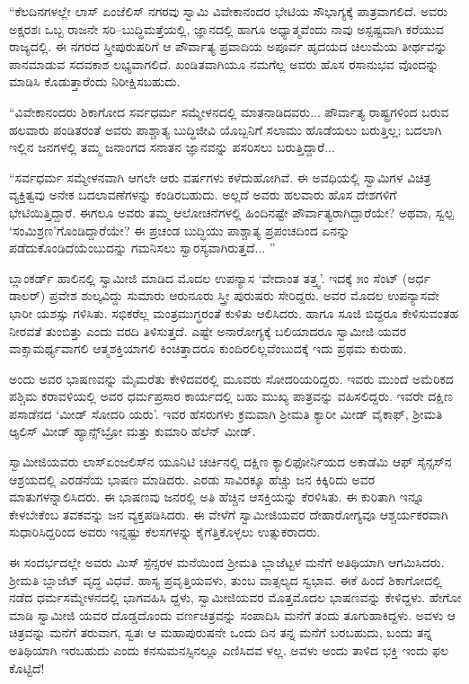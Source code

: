 “ಕೆಲದಿನಗಳಲ್ಲೇ ಲಾಸ್ ಏಂಜೆಲಿಸ್ ನಗರವು ಸ್ವಾಮಿ ವಿವೇಕಾನಂದರ ಭೇಟಿಯ ಸೌಭಾಗ್ಯಕ್ಕೆ ಪಾತ್ರವಾಗಲಿದೆ. ಅವರು ಅಕ್ಷರಶಃ ಒಬ್ಬ ರಾಜನೇ ಸರಿ–ಬುದ್ಧಿಮತ್ತೆಯಲ್ಲಿ, ಜ್ಞಾನದಲ್ಲಿ ಹಾಗೂ ಅಧ್ಯಾತ್ಮವೆಂದು ನಾವು ಅಸ್ಪಷ್ಟವಾಗಿ ಕರೆಯುವ ರಾಜ್ಯದಲ್ಲಿ. ಈ ನಗರದ ಸ್ತ್ರೀಪುರುಷರಿಗೆ ಆ ಪೌರ್ವಾತ್ಯ ಪ್ರವಾದಿಯ ಅಪೂರ್ವ ಹೃದಯದ ಚಿಲುಮೆಯ ತೀರ್ಥವನ್ನು ಪಾನಮಾಡುವ ಸದವಕಾಶ ಲಭ್ಯವಾಗಲಿದೆ. ಖಂಡಿತವಾಗಿಯೂ ನಮಗೆಲ್ಲ ಅವರು ಹೊಸ ರಸಾನುಭವ ವೊಂದನ್ನು ಮಾಡಿಸಿ ಕೊಡುತ್ತಾರೆಂದು ನಿರೀಕ್ಷಿಸಬಹುದು.

“ವಿವೇಕಾನಂದರು ಶಿಕಾಗೋದ ಸರ್ವಧರ್ಮ ಸಮ್ಮೇಳನದಲ್ಲಿ ಮಾತನಾಡಿದವರು... ಪೌರ್ವಾತ್ಯ ರಾಷ್ಟ್ರಗಳಿಂದ ಬರುವ ಹಲವಾರು ಪಂಡಿತರಂತೆ ಅವರು ಪಾಶ್ಚಾತ್ಯ ಬುದ್ಧಿಜೀವಿ ಯೊಬ್ಬನಿಗೆ ಸಲಾಮು ಹೊಡೆಯಲು ಬರುತ್ತಿಲ್ಲ; ಬದಲಾಗಿ ಇಲ್ಲಿನ ಜನಗಳಲ್ಲಿ ತಮ್ಮ ಜನಾಂಗದ ಸನಾತನ ಜ್ಞಾನವನ್ನು ಪಸರಿಸಲು ಬರುತ್ತಿದ್ದಾರೆ...

“ಸರ್ವಧರ್ಮ ಸಮ್ಮೇಳನವಾಗಿ ಆಗಲೇ ಆರು ವರ್ಷಗಳು ಕಳೆದುಹೋಗಿವೆ. ಈ ಅವಧಿಯಲ್ಲಿ ಸ್ವಾಮಿಗಳ ವಿಚಿತ್ರ ವ್ಯಕ್ತಿತ್ವವು ಅನೇಕ ಬದಲಾವಣೆಗಳನ್ನು ಕಂಡಿರಬಹುದು. ಅಲ್ಲದೆ ಅವರು ಹಲವಾರು ಹೊಸ ದೇಶಗಳಿಗೆ ಭೇಟಿಯಿತ್ತಿದ್ದಾರೆ. ಈಗಲೂ ಅವರು ತಮ್ಮ ಆಲೋಚನೆಗಳಲ್ಲಿ ಹಿಂದಿನಷ್ಟೇ ಪೌರ್ವಾತ್ಯರಾಗಿದ್ದಾರೆಯೇ? ಅಥವಾ, ಸ್ವಲ್ಪ ‘ಸಂಮಿಶ್ರಣ’ಗೊಂಡಿದ್ದಾರೆಯೇ? ಈ ಪ್ರಚಂಡ ಬುದ್ಧಿಯು ಪಾಶ್ಚಾತ್ಯ ಪ್ರಪಂಚದಿಂದ ಏನನ್ನು ಪಡೆದುಕೊಂಡಿದೆಯೆಂಬುದನ್ನು ಗಮನಿಸಲು ಸ್ವಾರಸ್ಯವಾಗಿರುತ್ತದೆ... ”

ಬ್ಲಾಂಕರ್ಡ್ ಹಾಲಿನಲ್ಲಿ ಸ್ವಾಮೀಜಿ ಮಾಡಿದ ಮೊದಲ ಉಪನ್ಯಾಸ ‘ವೇದಾಂತ ತತ್ತ್ವ’. ಇದಕ್ಕೆ ೫ಂ ಸೆಂಟ್ (ಅರ್ಧ ಡಾಲರ್​) ಪ್ರವೇಶ ಶುಲ್ಕವಿದ್ದು ಸುಮಾರು ಆರುನೂರು ಸ್ತ್ರೀ ಪುರುಷರು ಸೇರಿದ್ದರು. ಅವರ ಮೊದಲ ಉಪನ್ಯಾಸವೇ ಭಾರೀ ಯಶಸ್ಸು ಗಳಿಸಿತು. ಸಭಿಕರೆಲ್ಲ ಮಂತ್ರಮುಗ್ಧರಂತೆ ಕುಳಿತು ಆಲಿಸಿದರು. ಹಾಗೂ ಸೂಜಿ ಬಿದ್ದರೂ ಕೇಳಿಸುವಂತಹ ನೀರವತೆ ತುಂಬಿತ್ತು ಎಂದು ವರದಿ ತಿಳಿಸುತ್ತದೆ. ಎಷ್ಟೇ ಅನಾರೋಗ್ಯಕ್ಕೆ ಬಲಿಯಾದರೂ ಸ್ವಾಮೀಜಿ ಯವರ ವಾಕ್ಸಾಮರ್ಥ್ಯವಾಗಲಿ ಆತ್ಮಶಕ್ತಿಯಾಗಲಿ ಕಿಂಚಿತ್ತಾದರೂ ಕುಂದಿರಲಿಲ್ಲವೆಂಬುದಕ್ಕೆ ಇದು ಪ್ರಥಮ ಕುರುಹು.

ಅಂದು ಅವರ ಭಾಷಣವನ್ನು ಮೈಮರೆತು ಕೇಳಿದವರಲ್ಲಿ ಮೂವರು ಸೋದರಿಯರಿದ್ದರು. ಇವರು ಮುಂದೆ ಅಮೆರಿಕದ ಪಶ್ಚಿಮ ಕರಾವಳಿಯಲ್ಲಿ ಅವರ ಧರ್ಮಪ್ರಸಾರ ಕಾರ್ಯದಲ್ಲಿ ಬಹು ಮುಖ್ಯ ಪಾತ್ರವನ್ನು ವಹಿಸಲಿದ್ದರು. ಇವರೇ ದಕ್ಷಿಣ ಪಸಾಡೆನದ ‘ಮೀಡ್ ಸೋದರಿ ಯರು’. ಇವರ ಹೆಸರುಗಳು ಕ್ರಮವಾಗಿ ಶ್ರೀಮತಿ ಕ್ಯಾರೀ ಮೀಡ್ ವೈಕಾಫ್, ಶ್ರೀಮತಿ ಆ್ಯಲಿಸ್ ಮೀಡ್ ಹ್ಯಾನ್ಸ್​ಬ್ರೋ ಮತ್ತು ಕುಮಾರಿ ಹೆಲೆನ್ ಮೀಡ್.

ಸ್ವಾಮೀಜಿಯವರು ಲಾಸ್​ಏಂಜಲಿಸ್​ನ ಯೂನಿಟಿ ಚರ್ಚಿನಲ್ಲಿ ದಕ್ಷಿಣ ಕ್ಯಾಲಿಫೋರ್ನಿಯದ ಅಕಾಡೆಮಿ ಆಫ್ ಸೈನ್ಸಸ್​ನ ಆಶ್ರಯದಲ್ಲಿ ಎರಡನೆಯ ಭಾಷಣ ಮಾಡಿದರು. ಎರಡು ಸಾವಿರಕ್ಕೂ ಹೆಚ್ಚು ಜನ ಕಿಕ್ಕಿರಿದು ಅವರ ಮಾತುಗಳನ್ನಾಲಿಸಿದರು. ಈ ಭಾಷಣವು ಜನರಲ್ಲಿ ಅತಿ ಹೆಚ್ಚಿನ ಆಸಕ್ತಿಯನ್ನು ಕೆರಳಿಸಿತು. ಈ ಕುರಿತಾಗಿ ಇನ್ನೂ ಕೇಳಬೇಕೆಂಬ ತವಕವನ್ನು ಜನ ವ್ಯಕ್ತಪಡಿಸಿದರು. ಈ ವೇಳೆಗೆ ಸ್ವಾಮೀಜಿಯವರ ದೇಹಾರೋಗ್ಯವೂ ಆಶ್ಚರ್ಯಕರವಾಗಿ ಸುಧಾರಿಸಿದ್ದರಿಂದ ಅವರು ಇನ್ನಷ್ಟು ಕೆಲಸಗಳನ್ನು ಕೈಗೆತ್ತಿಕೊಳ್ಳಲು ಉತ್ಸುಕರಾದರು.

ಈ ಸಂದರ್ಭದಲ್ಲೇ ಅವರು ಮಿಸ್ ಸ್ಪೆನ್ಸರಳ ಮನೆಯಿಂದ ಶ್ರೀಮತಿ ಬ್ಲಾಜೆಟ್ಟಳ ಮನೆಗೆ ಅತಿಥಿಯಾಗಿ ಆಗಮಿಸಿದರು. ಶ್ರೀಮತಿ ಬ್ಲಾಜೆಟ್ ವೃದ್ಧ ವಿಧವೆ. ಹಾಸ್ಯ ಪ್ರವೃತ್ತಿಯವಳು, ತುಂಬ ವಾತ್ಸಲ್ಯದ ಸ್ವಭಾವ. ಈಕೆ ಹಿಂದೆ ಶಿಕಾಗೋದಲ್ಲಿ ನಡೆದ ಧರ್ಮಸಮ್ಮೇಳನದಲ್ಲಿ ಭಾಗವಹಿಸಿ ದ್ದಳು, ಸ್ವಾಮೀಜಿಯವರ ಮೊತ್ತಮೊದಲ ಭಾಷಣವನ್ನು ಕೇಳಿದ್ದಳು. ಹೇಗೋ ಮಾಡಿ ಸ್ವಾಮೀಜಿ ಯವರ ದೊಡ್ಡದೊಂದು ವರ್ಣಚಿತ್ರವನ್ನು ಸಂಪಾದಿಸಿ ಮನೆಗೆ ತಂದು ತೂಗುಹಾಕಿದ್ದಳು. ಅವಳು ಆ ಚಿತ್ರವನ್ನು ಮನೆಗೆ ತರುವಾಗ, ಸ್ವತಃ ಆ ಮಹಾಪುರುಷನೇ ಒಂದು ದಿನ ತನ್ನ ಮನೆಗೆ ಬರಬಹುದು, ಬಂದು ತನ್ನ ಅತಿಥಿಯಾಗಿ ಇರಬಹುದು ಎಂದು ಕನಸುಮನಸ್ಸಿನಲ್ಲೂ ಎಣಿಸಿದವ ಳಲ್ಲ. ಅವಳು ಅಂದು ತಾಳಿದ ಭಕ್ತಿ ಇಂದು ಫಲ ಕೊಟ್ಟಿದೆ!

